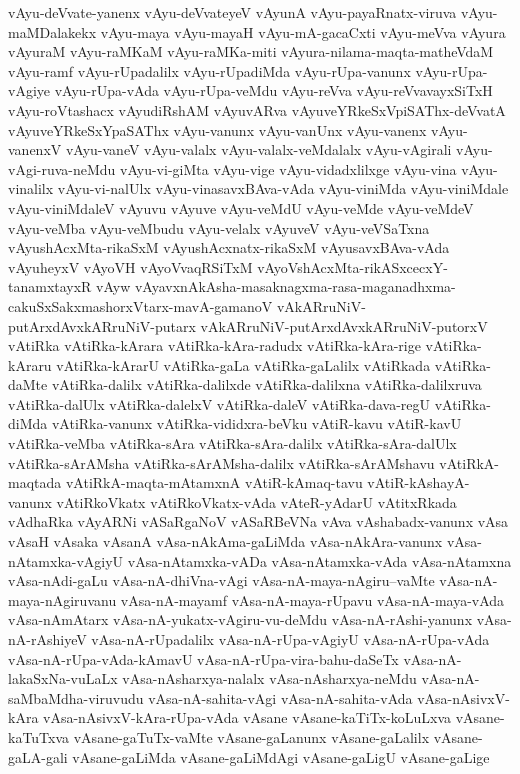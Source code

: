{vAyu-deVvate-yanenx
vAyu-deVvateyeV
vAyunA
vAyu-payaRnatx-viruva
vAyu-maMDalakekx
vAyu-maya
vAyu-mayaH
vAyu-mA-gacaCxti
vAyu-meVva
vAyura
vAyuraM
vAyu-raMKaM
vAyu-raMKa-miti
vAyura-nilama-maqta-matheVdaM
vAyu-ramf
vAyu-rUpadalilx
vAyu-rUpadiMda
vAyu-rUpa-vanunx
vAyu-rUpa-vAgiye
vAyu-rUpa-vAda
vAyu-rUpa-veMdu
vAyu-reVva
vAyu-reVvavayxSiTxH
vAyu-roVtashacx
vAyudiRshAM
vAyuvARva
vAyuveYRkeSxVpiSAThx-deVvatA
vAyuveYRkeSxYpaSAThx
vAyu-vanunx
vAyu-vanUnx
vAyu-vanenx
vAyu-vanenxV
vAyu-vaneV
vAyu-valalx
vAyu-valalx-veMdalalx
vAyu-vAgirali
vAyu-vAgi-ruva-neMdu
vAyu-vi-giMta
vAyu-vige
vAyu-vidadxlilxge
vAyu-vina
vAyu-vinalilx
vAyu-vi-nalUlx
vAyu-vinasavxBAva-vAda
vAyu-viniMda
vAyu-viniMdale
vAyu-viniMdaleV
vAyuvu
vAyuve
vAyu-veMdU
vAyu-veMde
vAyu-veMdeV
vAyu-veMba
vAyu-veMbudu
vAyu-velalx
vAyuveV
vAyu-veVSaTxna
vAyushAcxMta-rikaSxM
vAyushAcxnatx-rikaSxM
vAyusavxBAva-vAda
vAyuheyxV
vAyoVH
vAyoVvaqRSiTxM
vAyoVshAcxMta-rikASxcecxY-tanamxtayxR
vAyw
vAyavxnAkAsha-masaknagxma-rasa-maganadhxma-cakuSxSakxmashorxVtarx-mavA-gamanoV
vAkARruNiV-putArxdAvxkARruNiV-putarx
vAkARruNiV-putArxdAvxkARruNiV-putorxV
vAtiRka
vAtiRka-kArara
vAtiRka-kAra-radudx
vAtiRka-kAra-rige
vAtiRka-kAraru
vAtiRka-kArarU
vAtiRka-gaLa
vAtiRka-gaLalilx
vAtiRkada
vAtiRka-daMte
vAtiRka-dalilx
vAtiRka-dalilxde
vAtiRka-dalilxna
vAtiRka-dalilxruva
vAtiRka-dalUlx
vAtiRka-dalelxV
vAtiRka-daleV
vAtiRka-dava-regU
vAtiRka-diMda
vAtiRka-vanunx
vAtiRka-vididxra-beVku
vAtiR-kavu
vAtiR-kavU
vAtiRka-veMba
vAtiRka-sAra
vAtiRka-sAra-dalilx
vAtiRka-sAra-dalUlx
vAtiRka-sArAMsha
vAtiRka-sArAMsha-dalilx
vAtiRka-sArAMshavu
vAtiRkA-maqtada
vAtiRkA-maqta-mAtamxnA
vAtiR-kAmaq-tavu
vAtiR-kAshayA-vanunx
vAtiRkoVkatx
vAtiRkoVkatx-vAda
vAteR-yAdarU
vAtitxRkada
vAdhaRka
vAyARNi
vASaRgaNoV
vASaRBeVNa
vAva
vAshabadx-vanunx
vAsa
vAsaH
vAsaka
vAsanA
vAsa-nAkAma-gaLiMda
vAsa-nAkAra-vanunx
vAsa-nAtamxka-vAgiyU
vAsa-nAtamxka-vADa
vAsa-nAtamxka-vAda
vAsa-nAtamxna
vAsa-nAdi-gaLu
vAsa-nA-dhiVna-vAgi
vAsa-nA-maya-nAgiru--vaMte
vAsa-nA-maya-nAgiruvanu
vAsa-nA-mayamf
vAsa-nA-maya-rUpavu
vAsa-nA-maya-vAda
vAsa-nAmAtarx
vAsa-nA-yukatx-vAgiru-vu-deMdu
vAsa-nA-rAshi-yanunx
vAsa-nA-rAshiyeV
vAsa-nA-rUpadalilx
vAsa-nA-rUpa-vAgiyU
vAsa-nA-rUpa-vAda
vAsa-nA-rUpa-vAda-kAmavU
vAsa-nA-rUpa-vira-bahu-daSeTx
vAsa-nA-lakaSxNa-vuLaLx
vAsa-nAsharxya-nalalx
vAsa-nAsharxya-neMdu
vAsa-nA-saMbaMdha-viruvudu
vAsa-nA-sahita-vAgi
vAsa-nA-sahita-vAda
vAsa-nAsivxV-kAra
vAsa-nAsivxV-kAra-rUpa-vAda
vAsane
vAsane-kaTiTx-koLuLxva
vAsane-kaTuTxva
vAsane-gaTuTx-vaMte
vAsane-gaLanunx
vAsane-gaLalilx
vAsane-gaLA-gali
vAsane-gaLiMda
vAsane-gaLiMdAgi
vAsane-gaLigU
vAsane-gaLige
}
